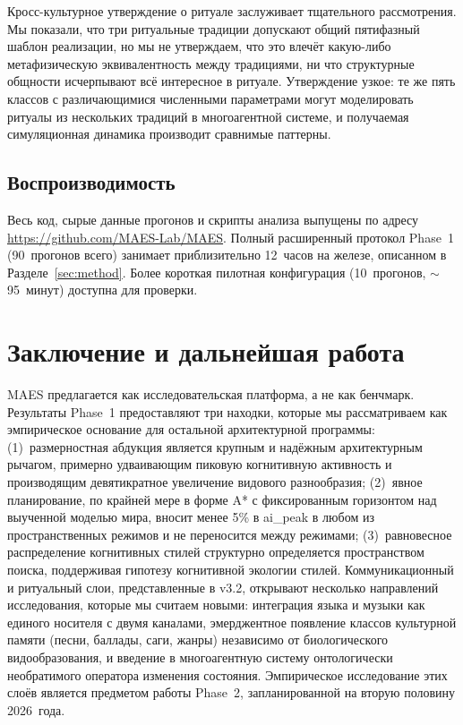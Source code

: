 \documentclass[11pt,a4paper]{article}
\begin{document}
Кросс-культурное утверждение о ритуале заслуживает тщательного
рассмотрения. Мы показали, что три ритуальные традиции допускают общий
пятифазный шаблон реализации, но мы не утверждаем, что это влечёт
какую-либо метафизическую эквивалентность между традициями, ни что
структурные общности исчерпывают всё интересное в ритуале.
Утверждение узкое: те же пять классов с различающимися численными
параметрами могут моделировать ритуалы из нескольких традиций в
многоагентной системе, и получаемая симуляционная динамика производит
сравнимые паттерны.

\subsection{Воспроизводимость}

Весь код, сырые данные прогонов и скрипты анализа выпущены по адресу
\url{https://github.com/MAES-Lab/MAES}. Полный расширенный протокол
Phase~1 (90~прогонов всего) занимает приблизительно 12~часов на железе,
описанном в Разделе~\ref{sec:method}. Более короткая пилотная
конфигурация (10~прогонов, $\sim$95~минут) доступна для проверки.

\section{Заключение и дальнейшая работа}
\label{sec:conclusion}

MAES предлагается как исследовательская платформа, а не как бенчмарк.
Результаты Phase~1 предоставляют три находки, которые мы рассматриваем
как эмпирическое основание для остальной архитектурной программы:
(1)~размерностная абдукция является крупным и надёжным архитектурным
рычагом, примерно удваивающим пиковую когнитивную активность и
производящим девятикратное увеличение видового разнообразия;
(2)~явное планирование, по крайней мере в форме A* с фиксированным
горизонтом над выученной моделью мира, вносит менее 5\% в ai\_peak в
любом из пространственных режимов и не переносится между режимами;
(3)~равновесное распределение когнитивных стилей структурно определяется
пространством поиска, поддерживая гипотезу когнитивной экологии
стилей. Коммуникационный и ритуальный слои, представленные в v3.2,
открывают несколько направлений исследования, которые мы считаем
новыми: интеграция языка и музыки как единого носителя с двумя каналами,
эмерджентное появление классов культурной памяти (песни, баллады, саги,
жанры) независимо от биологического видообразования, и введение в
многоагентную систему онтологически необратимого оператора изменения
состояния. Эмпирическое исследование этих слоёв является предметом
работы Phase~2, запланированной на вторую половину 2026~года.
\end{document}
